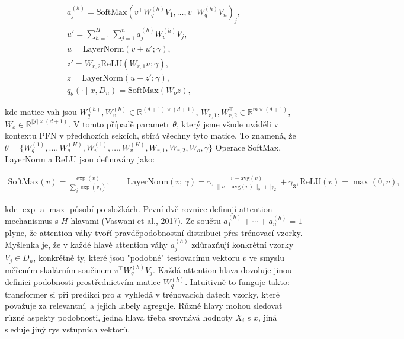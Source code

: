 \begin{gather*}
a_j^{(h)} = \mathrm{SoftMax}\left(v^\top W_q^{(h)}V_1, \dots, v^\top W_q^{(h)}V_n\right)_j, \\[2ex]
u' = \sum_{h=1}^H \sum_{j=1}^n a_j^{(h)} W_v^{(h)} V_j, \\[2ex]
u = \mathrm{LayerNorm}(v + u'; \gamma), \\[2ex]
z' = W_{r,2}\mathrm{ReLU}(W_{r,1}u; \gamma), \\[2ex]
z = \mathrm{LayerNorm}(u + z'; \gamma), \\[2ex]
q_\theta(\cdot \mid x, D_n) = \mathrm{SoftMax}(W_o z),
\end{gather*}

kde matice vah jsou $W^{(h)}_q, W^{(h)}_v \in \mathbb{R}^{(d+1)\times(d+1)}$, $W_{r,1}, W_{r,2}^\top \in \mathbb{R}^{m\times(d+1)}$, $W_o \in \mathbb{R}^{|\mathcal{Y}|\times(d+1)}$. 
V tomto případě parametr $\theta$, který jsme všude uváděli v kontextu PFN v předchozích sekcích, sbírá všechny tyto matice. 
To znamená, že $\theta = \{ W_q^{(1)}, \dots, W_q^{(H)}, W_v^{(1)}, \dots, W_v^{(H)}, W_{r,1}, W_{r,2}, W_o, \gamma \}$
Operace SoftMax, LayerNorm a ReLU jsou definovány jako:

\begin{gather*}
\mathrm{SoftMax}(v) = \frac{\exp(v)}{\sum_j \exp(v_j)}, \qquad \mathrm{LayerNorm}(v;\,\gamma) = \gamma_1 \frac{v - \mathrm{avg}(v)}{\|v - \mathrm{avg}(v)\|_2 + |\gamma_2|} + \gamma_3,
\mathrm{ReLU}(v) = \max(0, v),
\end{gather*}

kde $\exp$ a $\max$ působí po složkách.
První dvě rovnice definují attention mechanismus s $H$ hlavami (Vaswani et al., 2017). 
Ze součtu $a^{(h)}_1 + \cdots + a^{(h)}_n = 1$ plyne, že attention váhy tvoří pravděpodobnostní distribuci přes trénovací vzorky.
Myšlenka je, že v každé hlavě attention váhy $a^{(h)}_j$ zdůrazňují konkrétní vzorky $V_j \in D_n$, konkrétně ty, které jsou "podobné" testovacímu vektoru $v$ ve smyslu měřeném skalárním součinem $v^\top W^{(h)}_q V_j$. 
Každá attention hlava dovoluje jinou definici podobnosti prostřednictvím matice $W^{(h)}_q$.
Intuitivně to funguje takto: transformer si při predikci pro $x$ vyhledá v trénovacích datech vzorky, které považuje za relevantní, a jejich labely agreguje. Různé hlavy mohou sledovat různé aspekty podobnosti, jedna hlava třeba srovnává hodnoty $X_i$ s $x$, jiná sleduje jiný rys vstupních vektorů.
\par   

